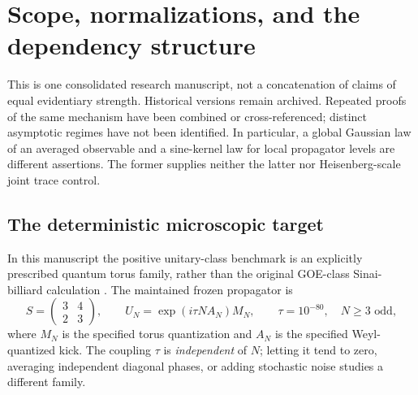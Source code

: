 \section{Scope, normalizations, and the dependency structure}
\label{sec:scope}
This is one consolidated research manuscript, not a concatenation of claims
of equal evidentiary strength. Historical versions remain archived. Repeated
proofs of the same mechanism have been combined or cross-referenced; distinct
asymptotic regimes have not been identified. In particular, a global Gaussian
law of an averaged observable and a sine-kernel law for local propagator
levels are different assertions. The former supplies neither the latter
nor Heisenberg-scale joint trace control.

\subsection{The deterministic microscopic target}
\label{subsec:unresolved-deterministic-target}
In this manuscript the positive unitary-class benchmark is an
explicitly prescribed quantum torus family, rather than the original
GOE-class Sinai-billiard calculation \cite{BGS1984}. The maintained
frozen propagator is
\begin{equation}
 S=\begin{pmatrix}3&4\\2&3\end{pmatrix},\qquad
 U_N=\exp(i\tau N A_N)M_N,\qquad
 \tau=10^{-80},\quad N\ge3\text{ odd},
 \label{eq:frozen-target-introduction}
\end{equation}
where $M_N$ is the specified torus quantization and $A_N$ is the
specified Weyl-quantized kick. The coupling $\tau$ is \emph{independent}
of $N$; letting it tend to zero, averaging independent diagonal phases,
or adding stochastic noise studies a different family.

